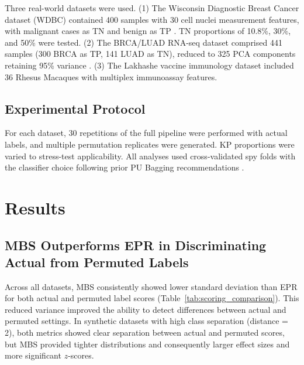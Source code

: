 \documentclass[12pt]{article}
\begin{document}
Three real-world datasets were used. (1) The Wisconsin Diagnostic Breast Cancer dataset (WDBC) contained 400 samples with 30 cell nuclei measurement features, with malignant cases as TN and benign as TP \citep{wolberg1995breast}. TN proportions of 10.8\%, 30\%, and 50\% were tested. (2) The BRCA/LUAD RNA-seq dataset comprised 441 samples (300 BRCA as TP, 141 LUAD as TN), reduced to 325 PCA components retaining 95\% variance \citep{weinstein2013cancer, jolliffe2016principal}. (3) The Lakhashe vaccine immunology dataset included 36 Rhesus Macaques with multiplex immunoassay features.

\subsection{Experimental Protocol}

For each dataset, 30 repetitions of the full pipeline were performed with actual labels, and multiple permutation replicates were generated. KP proportions were varied to stress-test applicability. All analyses used cross-validated spy folds with the classifier choice following prior PU Bagging recommendations \citep{mordelet2014bagging}.

\section{Results}

\subsection{MBS Outperforms EPR in Discriminating Actual from Permuted Labels}

Across all datasets, MBS consistently showed lower standard deviation than EPR for both actual and permuted label scores (Table~\ref{tab:scoring_comparison}). This reduced variance improved the ability to detect differences between actual and permuted settings. In synthetic datasets with high class separation (distance = 2), both metrics showed clear separation between actual and permuted scores, but MBS provided tighter distributions and consequently larger effect sizes and more significant $z$-scores.
\end{document}
